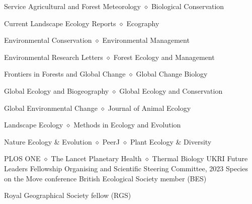 
\begin{rubric}{Service}
	Agricultural and Forest Meteorology $\diamond$ Biological Conservation 
	\par Current Landscape Ecology Reports $\diamond$ Ecography 
	\par Environmental Conservation $\diamond$ Environmental Management
	\par Environmental Research Letters $\diamond$ Forest Ecology and Management
	\par Frontiers in Forests and Global Change $\diamond$ Global Change Biology
	\par Global Ecology and Biogeography $\diamond$ Global Ecology and Conservation
	\par Global Environmental Change $\diamond$ Journal of Animal Ecology
	\par Landscape Ecology $\diamond$ Methods in Ecology and Evolution
	\par Nature Ecology \& Evolution $\diamond$ PeerJ $\diamond$ Plant Ecology \& Diversity
	\par PLOS ONE $\diamond$ The Lancet Planetary Health $\diamond$ Thermal Biology
	UKRI Future Leaders Fellowship 
	Organising and Scientific Steering Committee, 2023 Species on the Move conference 
	British Ecological Society member (BES)
	\par Royal Geographical Society fellow (RGS)
\end{rubric}
